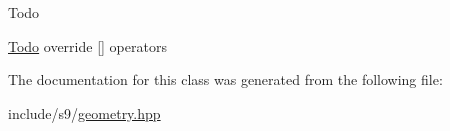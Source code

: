 \begin{DoxyRefDesc}{\-Todo}
\item[\hyperlink{todo__todo000013}{\-Todo}]override \mbox{[}\mbox{]} operators \end{DoxyRefDesc}


\-The documentation for this class was generated from the following file\-:\begin{DoxyCompactItemize}
\item 
include/s9/\hyperlink{geometry_8hpp}{geometry.\-hpp}\end{DoxyCompactItemize}

